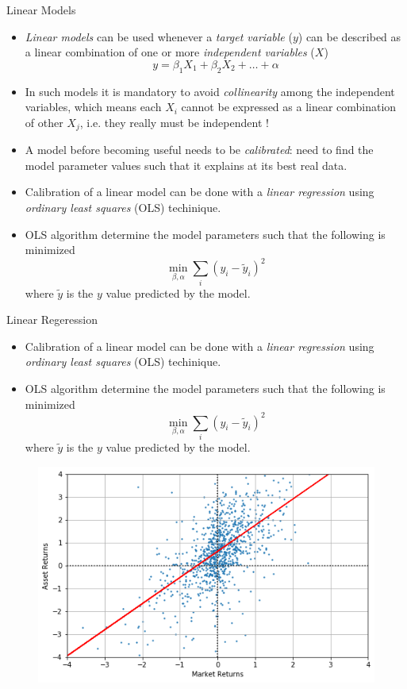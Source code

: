 \documentclass{beamer}
\begin{document}
\begin{frame}{Linear Models}
  \begin{itemize}
    \item \emph{Linear models} can be used whenever a \emph{target variable} ($y$) can be described as a linear combination of one or more \emph{independent variables} ($X$)
      \begin{equation*}
        y = \beta_1 X_1 + \beta_2 X_2 + \ldots + \alpha
      \end{equation*}
    \item In such models it is mandatory to avoid \emph{collinearity} among the independent variables, which means each $X_i$ cannot be expressed as a linear combination of other $X_j$, i.e. they really must be independent !
    \item A model before becoming useful needs to be \emph{calibrated}: need to find the model parameter values such that it explains at its best real data.
    \item Calibration of a linear model can be done with a \emph{linear regression} using \emph{ordinary least squares} (OLS) techinique.
    \item OLS algorithm determine the model parameters such that the following is minimized
      \begin{equation*}
        \min_{\beta,\alpha}\sum_i (y_i - \tilde{y}_i)^2
      \end{equation*}
      where $\tilde{y}$ is the $y$ value predicted by the model.
  \end{itemize}
\end{frame}

\begin{frame}{Linear Regeression}
  \begin{itemize}
  \item Calibration of a linear model can be done with a \emph{linear regression} using \emph{ordinary least squares} (OLS) techinique.
  \item OLS algorithm determine the model parameters such that the following is minimized
    \begin{equation*}
      \min_{\beta,\alpha}\sum_i (y_i - \tilde{y}_i)^2
    \end{equation*}
    where $\tilde{y}$ is the $y$ value predicted by the model.
  \end{itemize}
  \begin{figure}[h]
    \begin{center}
      \includegraphics[width=0.45\linewidth]{linear_regression}
    \end{center}
  \end{figure}
\end{frame}
\end{document}
